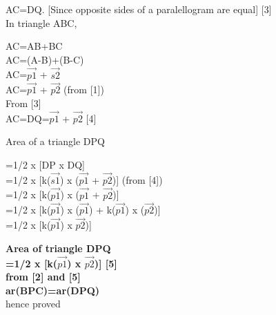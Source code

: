 \documentclass[journal,12pt,twocolumn]{IEEEtran}
\begin{document}
\begin{flushleft}
AC=DQ. [Since opposite sides of a paralellogram are equal]
 \hspace{4.5cm} [3] \\
\vspace{0.1cm}
In triangle ABC,\\ 
\begin{enumerate}
AC=AB+BC\\    AC=(A-B)+(B-C)\\    AC=$\vec{p1}$ + $\vec{s2}$\\
 AC=$\vec{p1}$ + $\vec{p2}$ (from [1])\\
 From [3]\\ AC=DQ=$\vec{p1}$ + $\vec{p2}$ \hspace{2.5cm}[4]\\
\end{enumerate} 
Area of a triangle DPQ\\
\begin{enumerate}
=1/2 x [DP x DQ]\\
=1/2 x [k($\vec{s1}$) x ($\vec{p1}$ + $\vec{p2}$)] (from [4])\\ 
=1/2 x [k($\vec{p1}$) x ($\vec{p1}$ + $\vec{p2}$)]\\ 
=1/2 x [k($\vec{p1}$) x ($\vec{p1}$) + k($\vec{p1}$) x ($\vec{p2}$)]\\ 
=1/2 x [k($\vec{p1}$) x $\vec{p2}$)]\\
\end{enumerate}
\textbf{Area of triangle DPQ}\\
\vspace{0.1cm}
\textbf{=1/2 x [k($\vec{p1}$) x $\vec{p2}$)]  \hspace{2.5cm} [5]}\\
\vspace{0.1cm}
\textbf{from [2] and [5]}\\
\vspace{0.1cm}
\textbf{ar(BPC)=ar(DPQ)}\\
\vspace{0.1cm}
hence proved\\

\end{flushleft}
\end{document}
